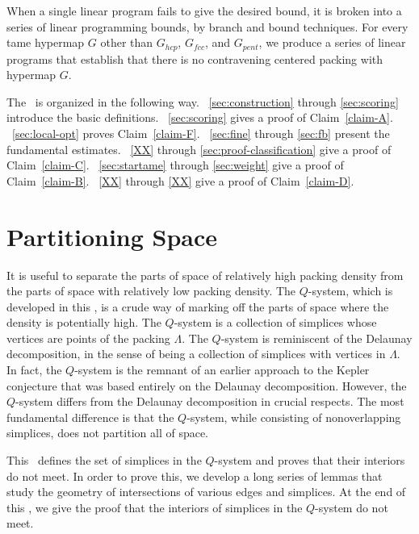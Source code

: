 When a single linear program fails to give the desired bound, it
is broken into a series of linear programming bounds, by branch
and bound techniques.  For every tame hypermap $G$ other than
$G_{hcp}$, $G_{fcc}$, and $G_{pent}$, we
produce a series of linear programs that establish that there is
no contravening centered packing with hypermap $G$.

The \paper~is organized in the following way.
\Chaps~\ref{sec:construction} through \ref{sec:scoring} introduce
the basic definitions.  \Chap~\ref{sec:scoring} gives a proof of
Claim~\ref{claim-A}. \Chap~\ref{sec:local-opt} proves
Claim~\ref{claim-F}. \Chaps~\ref{sec:fine} through \ref{sec:fb}
present the fundamental estimates. \Chaps~\ref{XX}
through \ref{sec:proof-classification} give a proof of
Claim~\ref{claim-C}. \Chaps~\ref{sec:startame} through
\ref{sec:weight} give a proof of Claim~\ref{claim-B}.
\Chaps~\ref{XX} through \ref{XX} give
a proof of Claim~\ref{claim-D}.


\section{Partitioning Space}





It is useful to separate the parts of space of relatively high
packing density from the parts of space with relatively low
packing density.  The $Q$-system, which is developed in this
\chap, is a crude way of marking off the parts of space where the
density is potentially high.  The $Q$-system is a collection of
simplices whose vertices are points of the packing $\Lambda$. The
$Q$-system is reminiscent of the Delaunay decomposition, in the
sense of being a collection of simplices with vertices in
$\Lambda$.  In fact, the $Q$-system is the remnant of an earlier
approach to the Kepler conjecture that was based entirely on the
Delaunay decomposition.  However, the $Q$-system differs from the
Delaunay decomposition in crucial respects.  The most fundamental
difference is that the $Q$-system, while consisting of
nonoverlapping simplices, does not partition all of space.

This \chap\ defines the set of simplices in the $Q$-system and
proves that their interiors do not meet.  In order to prove this,
we develop a long series of lemmas that study the geometry of
intersections of various edges and simplices.  At the end of this
\chap, we give the proof that the interiors of simplices in the
$Q$-system do not meet.



